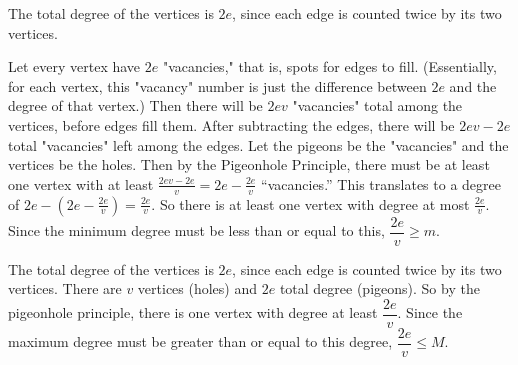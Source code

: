 \documentclass[12pt]{exam}
\begin{document}
\begin{solution}
    \begin{qparts}
        \item The total degree of the vertices is $2e$, since each edge is counted twice by its two vertices. 
        \par Let every vertex have $2e$ "vacancies," that is, spots for edges to fill. (Essentially, for each vertex, this "vacancy" number is just the difference between $2e$ and the degree of that vertex.) Then there will be $2ev$ "vacancies" total among the vertices, before edges fill them. After subtracting the edges, there will be $2ev - 2e$ total "vacancies" left among the edges. Let the pigeons be the "vacancies" and the vertices be the holes. Then by the Pigeonhole Principle, there must be at least one vertex with at least $\frac{2ev - 2e}{v} = 2e - \frac{2e}{v}$ ``vacancies.'' This translates to a degree of $2e - \left(2e - \frac{2e}{v}\right) = \frac{2e}{v}$. So there is at least one vertex with degree at most $\frac{2e}{v}$. Since the minimum degree must be less than or equal to this, $\dfrac{2e}{v} \geq m$.
        \item The total degree of the vertices is $2e$, since each edge is counted twice by its two vertices. There are $v$ vertices (holes) and $2e$ total degree (pigeons). So by the pigeonhole principle, there is one vertex with degree at least $\dfrac{2e}{v}$. Since the maximum degree must be greater than or equal to this degree, $\dfrac{2e}{v} \leq M$.
    \end{qparts}
\end{solution}

\clearpage
\end{document}
